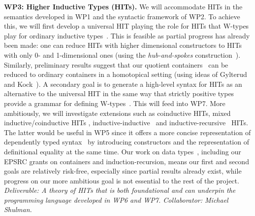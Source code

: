 \documentclass[a4paper,11pt]{article}
\begin{document}
{\bf WP3: Higher Inductive Types (HITs).}  We will accommodate HITs in
the semantics developed in WP1 and the syntactic framework of WP2. To
achieve this, we will first develop a universal HIT playing the role for
HITs that W-types play for ordinary inductive
types~\cite{alti:cont-tcs}. This is feasible as partial progress has
already been made: one can reduce HITs with higher dimensional
constructors to HITs with only 0- and 1-dimensional ones (using the
\emph{hub-and-spokes} construction~\cite{hott-book}).
Similarly, preliminary results suggest that our quotient
containers~\cite{alti:mpc04} can be reduced
to ordinary containers in a homotopical setting 
(using ideas of Gylterud~\cite{gylterud:thesis} and
Kock~\cite{kock:groupoids}).
%
A secondary goal is to generate a high-level syntax for HITs as
an alternative to the universal HIT in the same way that strictly
positive types provide a grammar for defining 
W-types~\cite{alti:cont-tcs}.  This will feed into WP7.
More ambitiously, we will %
investigate extensions such as coinductive HITs, mixed
inductive/coinductive HITs \cite{txa:mpc2010g}, 
inductive-inductive~\cite{alti:catind2} and
inductive-recursive~\cite{DS:indrec,ghani:fibredIR} HITs. The latter would be useful
in WP5 since it offers a more concise representation of dependently
typed syntax~\cite{chapman2009type} by introducing
constructors and the representation of definitional equality at the
same time.
Our work on data
types~\cite{alti:cont-tcs,
altenkirchGhaniHancockMcBrideMorris:indexedContainers,
alti:catind2,ghani:fibredIR,GambinoN:polfpm,awodeyGamSoja:indTypesInHTT},
including our EPSRC grants on containers and induction-recursion, means
our first and second goals
are relatively risk-free,
especially since partial results already exist, 
while progress on our more ambitious goal 
is not essential to the rest of the project. {\em Deliverable: A
  theory of HITs that is both foundational and can underpin the
  programming language developed in WP6 and WP7. 
Collaborator: Michael Shulman. 
}
\end{document}
